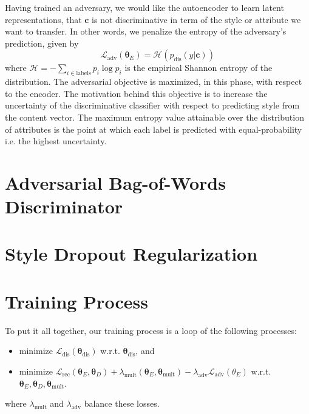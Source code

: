 Having trained an adversary, we would like the autoencoder to learn latent representations, that $\bm c$ is not discriminative in term of the style or attribute we want to transfer. In other words, we penalize the entropy of the adversary's prediction, given by
\begin{equation}
	\mathcal{L}_\text{adv}(\bm\theta_E) = \mathcal{H}(p_\text{dis}(y | \bm c))
\end{equation}
where $\mathcal{H}=-\sum_{i\in\text{labels}} p_i\log p_i$ is the empirical Shannon entropy of the distribution. The adversarial objective is maximized, in this phase, with respect to the encoder. The motivation behind this objective is to increase the uncertainty of the discriminative classifier with respect to predicting style from the content vector. The maximum entropy value attainable over the distribution of attributes is the point at which each label is predicted with equal-probability i.e. the highest uncertainty.

\section{Adversarial Bag-of-Words Discriminator} \label{ssec:adversarial-bow-objective}

\section{Style Dropout Regularization} \label{ssec:style-dropout}

\section{Training Process}

To put it all together, our training process is a loop of the following processes:
\begin{itemize}
	\item minimize $\mathcal{L}_\text{dis}(\bm\theta_\text{dis})$ w.r.t. $\bm\theta_\text{dis}$, and
	\item minimize $\mathcal{L}_\text{rec}(\bm\theta_E, \bm\theta_D) + \lambda_\text{mult}(\bm\theta_E,\bm\theta_\text{mult}) -\lambda_\text{adv}
		      \mathcal{L}_\text{adv}(\theta_E)$ w.r.t. $\bm\theta_E, \bm\theta_D, \bm\theta_\text{mult}$.
\end{itemize}
where $\lambda_\text{mult}$ and $\lambda_\text{adv}$ balance these losses.

